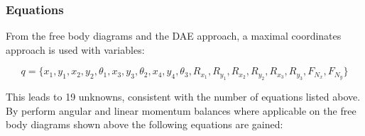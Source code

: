 \documentclass{article}
\begin{document}
\subsubsection{Equations}
From the free body diagrams and the DAE approach, a maximal coordinates approach is used with variables:
\begin{center}
	\begin{equation}
		q=\{x_1,y_1,x_2,y_2,\theta_1,x_3,y_3,\theta_2,x_4,y_4,\theta_3,R_{x_1},R_{y_1},R_{x_2},R_{y_2},R_{x_3},R_{y_3},F_{N_x}, F_{N_y} \}
	\end{equation} 
\end{center}
This leads to 19 unknowns, consistent with the number of equations listed above. By perform angular and linear momentum balances where applicable on the free body diagrams shown above the following equations are gained:
\end{document}

